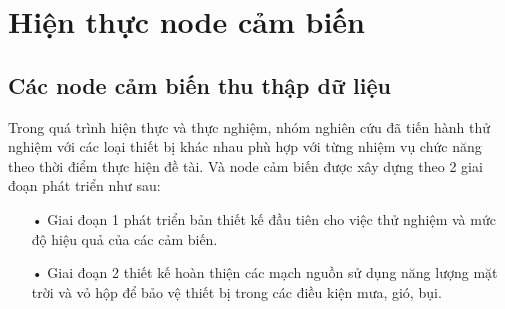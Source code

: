 \newpage

\section{Hiện thực node cảm biến}
\subsection{Các node cảm biến thu thập dữ liệu}
Trong quá trình hiện thực và thực nghiệm, nhóm nghiên cứu đã tiến hành thử nghiệm với các loại thiết bị khác nhau phù hợp với từng nhiệm vụ chức năng theo thời điểm thực hiện đề tài. Và node cảm biến được xây dựng theo 2 giai đoạn phát triển như sau:
\begin{itemize}
\item[•]Giai đoạn 1 phát triển bản thiết kế đầu tiên cho việc thử nghiệm và mức độ hiệu quả của các cảm biến.
\item[•]Giai đoạn 2 thiết kế hoàn thiện các mạch nguồn sử dụng năng lượng mặt trời và vỏ hộp để bảo vệ thiết bị trong các điều kiện mưa, gió, bụi.
\end{itemize}










